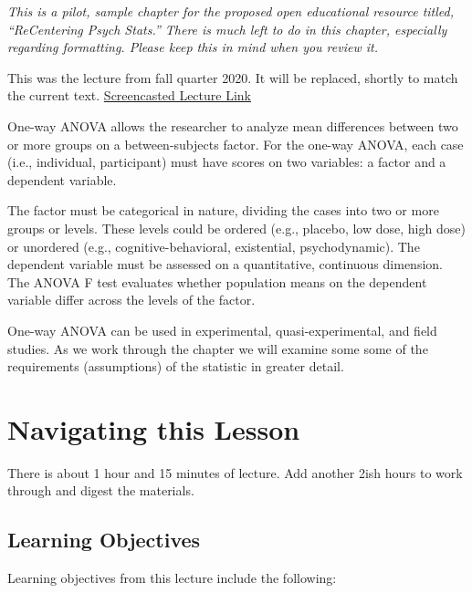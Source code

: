 \documentclass[
  english,
]{book}
\begin{document}
\emph{This is a pilot, sample chapter for the proposed open educational resource titled, ``ReCentering Psych Stats.'' There is much left to do in this chapter, especially regarding formatting. Please keep this in mind when you review it.}

This was the lecture from fall quarter 2020. It will be replaced, shortly to match the current text. \href{https://spu.hosted.panopto.com/Panopto/Pages/Viewer.aspx?pid=150b68bf-c880-4348-8114-acb7000b227e}{Screencasted Lecture Link}

One-way ANOVA allows the researcher to analyze mean differences between two or more groups on a between-subjects factor. For the one-way ANOVA, each case (i.e., individual, participant) must have scores on two variables: a factor and a dependent variable.

The factor must be categorical in nature, dividing the cases into two or more groups or levels. These levels could be ordered (e.g., placebo, low dose, high dose) or unordered (e.g., cognitive-behavioral, existential, psychodynamic). The dependent variable must be assessed on a quantitative, continuous dimension. The ANOVA F test evaluates whether population means on the dependent variable differ across the levels of the factor.

One-way ANOVA can be used in experimental, quasi-experimental, and field studies. As we work through the chapter we will examine some some of the requirements (assumptions) of the statistic in greater detail.

\hypertarget{navigating-this-lesson}{%
\section{Navigating this Lesson}\label{navigating-this-lesson}}

There is about 1 hour and 15 minutes of lecture. Add another 2ish hours to work through and digest the materials.

\hypertarget{learning-objectives}{%
\subsection{Learning Objectives}\label{learning-objectives}}

Learning objectives from this lecture include the following:
\end{document}
